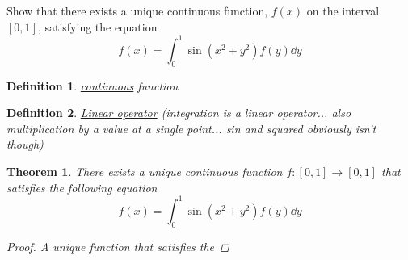 \documentclass[]{article}
\newtheorem{definition}{Definition}
\newtheorem{theorem}{Theorem}
\begin{document}
\newpage
\section{}
Show that there exists a unique continuous function, 
$f(x)$ on the interval $[0,1]$,
satisfying the equation
\[
    f(x) = \int_{0}^{1} \sin(x^2 + y^ 2) f(y) \dd y
\]


\begin{definition}
    \emph{\underline{continuous}} function
\end{definition}

\begin{definition}
    \emph{\underline{Linear operator}} (integration is a linear operator... also multiplication by a value at a single point... sin and squared obviously isn't though)
\end{definition}


\begin{theorem}
    There exists a unique continuous function $f : [0,1] \to [0,1]$
    that satisfies the following equation
    \begin{equation}\label{eq:pblm5}
        f(x) = \int_{0}^{1} \sin(x^2 + y^ 2) f(y) \dd y
    \end{equation}
    \begin{proof}
        A unique function that satisfies the
    \end{proof}
\end{theorem}
\end{document}
